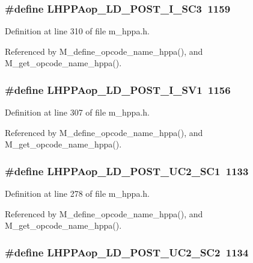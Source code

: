 \subsubsection{\setlength{\rightskip}{0pt plus 5cm}\#define LHPPAop\_\-LD\_\-POST\_\-I\_\-SC3~1159}\label{m__hppa_8h_7267ee28af1b2c6fb6bf3e11a7d50cba}




Definition at line 310 of file m\_\-hppa.h.

Referenced by M\_\-define\_\-opcode\_\-name\_\-hppa(), and M\_\-get\_\-opcode\_\-name\_\-hppa().
\subsubsection{\setlength{\rightskip}{0pt plus 5cm}\#define LHPPAop\_\-LD\_\-POST\_\-I\_\-SV1~1156}\label{m__hppa_8h_91300f721afa662d4e0688316959dd6b}




Definition at line 307 of file m\_\-hppa.h.

Referenced by M\_\-define\_\-opcode\_\-name\_\-hppa(), and M\_\-get\_\-opcode\_\-name\_\-hppa().
\subsubsection{\setlength{\rightskip}{0pt plus 5cm}\#define LHPPAop\_\-LD\_\-POST\_\-UC2\_\-SC1~1133}\label{m__hppa_8h_adea459a0a21ddcad8d7e9226726d1fd}




Definition at line 278 of file m\_\-hppa.h.

Referenced by M\_\-define\_\-opcode\_\-name\_\-hppa(), and M\_\-get\_\-opcode\_\-name\_\-hppa().
\subsubsection{\setlength{\rightskip}{0pt plus 5cm}\#define LHPPAop\_\-LD\_\-POST\_\-UC2\_\-SC2~1134}\label{m__hppa_8h_e81c0222241fb7cc7886259ca156b35f}




